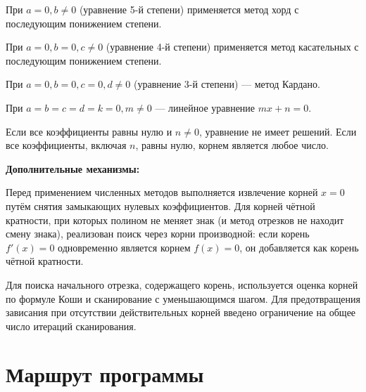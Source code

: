 \documentclass[a4paper,14pt]{extarticle}
\begin{document}
При \( a = 0, b \neq 0 \) (уравнение 5-й степени) применяется метод хорд с последующим понижением степени.

При \( a = 0, b = 0, c \neq 0 \) (уравнение 4-й степени) применяется метод касательных с последующим понижением степени.

При \( a = 0, b = 0, c = 0, d \neq 0 \) (уравнение 3-й степени) --- метод Кардано.

При \( a = b = c = d = k = 0, m \neq 0 \) --- линейное уравнение \( mx + n = 0 \).

Если все коэффициенты равны нулю и \( n \neq 0 \), уравнение не имеет решений.
Если все коэффициенты, включая \( n \), равны нулю, корнем является любое число.

\textbf{Дополнительные механизмы:}

Перед применением численных методов выполняется извлечение корней \( x = 0 \) путём снятия замыкающих нулевых коэффициентов. Для корней чётной кратности, при которых полином не меняет знак (и метод отрезков не находит смену знака), реализован поиск через корни производной: если корень \( f'(x) = 0 \) одновременно является корнем \( f(x) = 0 \), он добавляется как корень чётной кратности.

Для поиска начального отрезка, содержащего корень, используется оценка корней по формуле Коши и сканирование с уменьшающимся шагом. Для предотвращения зависания при отсутствии действительных корней введено ограничение на общее число итераций сканирования.

\newpage
\section*{Маршрут программы}
\label{sec:route}
\end{document}
